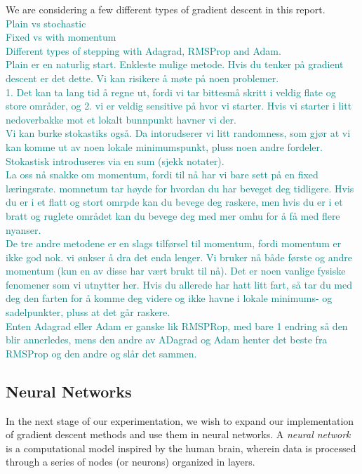 We are considering a few different types of gradient descent in this report.\\
\textcolor{teal}{Plain vs stochastic\\
Fixed vs with momentum\\
Different types of stepping with Adagrad, RMSProp and Adam.\\
Plain er en naturlig start. Enkleste mulige metode. Hvis du tenker på gradient descent er det dette. Vi kan risikere å møte på noen problemer. \\
1. Det kan ta lang tid å regne ut, fordi vi tar bittesmå skritt i veldig flate og store områder, og 2. vi er veldig sensitive på hvor vi starter. Hvis vi starter i litt nedoverbakke mot et lokalt bunnpunkt havner vi der. \\
Vi kan burke stokastiks også. Da intorudserer vi litt randomness, som gjør at vi kan komme ut av noen lokale minimumspunkt, pluss noen andre fordeler. Stokastisk introduseres via en sum (sjekk notater).\\
La oss nå snakke om momentum, fordi til nå har vi bare sett på en fixed læringsrate. momnetum tar høyde for hvordan du har beveget deg tidligere. Hvis du er i et flatt og stort omrpde kan du bevege deg raskere, men hvis du er i et bratt og ruglete området kan du bevege deg med mer omhu for å få med flere nyanser. \\
De tre andre metodene er en slags tilførsel til momentum, fordi momentum er ikke god nok. vi ønkser å dra det enda lenger. Vi bruker nå både første og andre momentum (kun en av disse har vært brukt til nå). Det er noen vanlige fysiske fenomener som vi utnytter her. Hvis du allerede har hatt litt fart, så tar du med deg den farten for å komme deg videre og ikke havne i lokale minimums- og sadelpunkter, pluss at det går raskere. \\
Enten Adagrad eller Adam er ganske lik RMSPRop, med bare 1 endring så den blir annerledes, mens den andre av ADagrad og Adam henter det beste fra RMSProp og den andre og slår det sammen. }



\subsection{Neural Networks}
In the next stage of our experimentation, we wish to expand our implementation of gradient descent methods and use them in neural networks. A \emph{neural network} is a computational model inspired by the human brain, wherein data is processed through a series of nodes (or neurons) organized in layers. 


